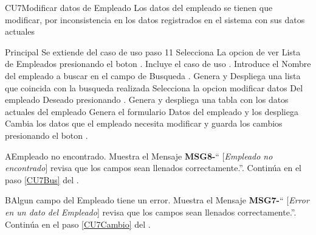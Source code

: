 \begin{UseCase}{CU7}{Modificar datos de  Empleado}{
		Los datos del empleado se tienen que modificar, por inconsistencia en los datos registrados en el sistema con sus datos actuales
	}
	\end{UseCase}
	\begin{UCtrayectoria}{Principal}
		\UCpaso Se extiende del caso de uso  paso 11
		\UCpaso[\UCactor] Selecciona La opcion de ver Lista de  Empleados presionando el boton .
		\UCpaso Incluye el caso de uso .
		\UCpaso[\UCactor] Introduce el Nombre del empleado a buscar en el campo de Busqueda  \label{CU7Bus}.
		\UCpaso Genera y Despliega una lista que coincida con la busqueda realizada
		\UCpaso[\UCactor] Selecciona la opcion modificar datos Del empleado Deseado presionando \label{CU7Cambio}.
		\UCpaso Genera y despliega una tabla con los datos actuales del empleado		
		\UCpaso Genera el formulario Datos del empleado y los despliega 
		\UCpaso[\UCactor] Cambia los datos que el empleado necesita modificar y guarda los cambios presionando el boton  .
	\end{UCtrayectoria}




\begin{UCtrayectoriaA}{A}{Empleado no encontrado.}
			\UCpaso Muestra el Mensaje {\bf MSG8-}`` [{\em Empleado no encontrado}] revisa que los campos sean llenados correctamente.''.
			\UCpaso Continúa en el paso \ref{CU7Bus} del .
		\end{UCtrayectoriaA}


\begin{UCtrayectoriaA}{B}{Algun campo del Empleado tiene un error.}
			\UCpaso Muestra el Mensaje {\bf MSG7-}`` [{\em Error en un dato del Empleado}] revisa que los campos sean llenados correctamente.''.
			\UCpaso Continúa en el paso \ref{CU7Cambio} del .
		\end{UCtrayectoriaA}


